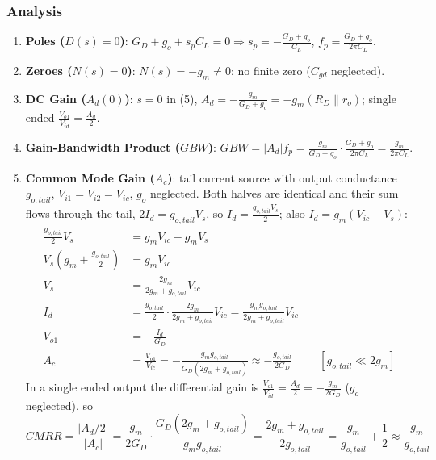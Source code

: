 \subsubsection{Analysis}
\begin{enumerate}
  \item \textbf{Poles (\(D(s) = 0\))}: \(G_D + g_o + s_p C_L = 0 \Rightarrow s_p = -\frac{G_D + g_o}{C_L}\),
    \(f_p = \frac{G_D + g_o}{2\pi C_L}\).
  \item \textbf{Zeroes (\(N(s) = 0\))}: \(N(s) = -g_m \neq 0\): no finite zero (\(C_{gd}\) neglected).
  \item \textbf{DC Gain (\(A_d(0)\))}: \(s = 0\) in (5),
    \(A_d = -\frac{g_m}{G_D + g_o} = -g_m (R_D \parallel r_o)\); single ended
    \(\frac{V_{o1}}{V_{id}} = \frac{A_d}{2}\).
  \item \textbf{Gain-Bandwidth Product (\(GBW\))}:
    \(GBW = |A_d| f_p = \frac{g_m}{G_D + g_o}\cdot\frac{G_D + g_o}{2\pi C_L} = \frac{g_m}{2\pi C_L}\).
  \item \textbf{Common Mode Gain (\(A_c\))}: tail current source with output conductance
    \(g_{o,tail}\), \(V_{i1} = V_{i2} = V_{ic}\), \(g_o\) neglected. Both halves
    are identical and their sum flows through the tail, \(2 I_d = g_{o,tail} V_s\),
    so \(I_d = \frac{g_{o,tail} V_s}{2}\); also \(I_d = g_m(V_{ic} - V_s)\):
    \begin{align*}
      \frac{g_{o,tail}}{2} V_s &= g_m V_{ic} - g_m V_s \\
      V_s \left(g_m + \frac{g_{o,tail}}{2}\right) &= g_m V_{ic} \\
      V_s &= \frac{2 g_m}{2 g_m + g_{o,tail}} V_{ic} \\
      I_d &= \frac{g_{o,tail}}{2} \cdot \frac{2 g_m}{2 g_m + g_{o,tail}} V_{ic} = \frac{g_m g_{o,tail}}{2 g_m + g_{o,tail}} V_{ic} \\
      V_{o1} &= -\frac{I_d}{G_D} \\
      A_c &= \frac{V_{o1}}{V_{ic}} = -\frac{g_m g_{o,tail}}{G_D(2 g_m + g_{o,tail})} \approx -\frac{g_{o,tail}}{2 G_D} \hspace{1cm} [g_{o,tail} \ll 2 g_m]
    \end{align*}
    In a single ended output the differential gain is
    \(\frac{V_{o1}}{V_{id}} = \frac{A_d}{2} = -\frac{g_m}{2 G_D}\) (\(g_o\) neglected), so
    \[
      CMRR = \frac{|A_d/2|}{|A_c|} = \frac{g_m}{2 G_D} \cdot \frac{G_D(2 g_m + g_{o,tail})}{g_m g_{o,tail}} = \frac{2 g_m + g_{o,tail}}{2 g_{o,tail}} = \frac{g_m}{g_{o,tail}} + \frac{1}{2} \approx \frac{g_m}{g_{o,tail}}
    \]

\end{enumerate}
